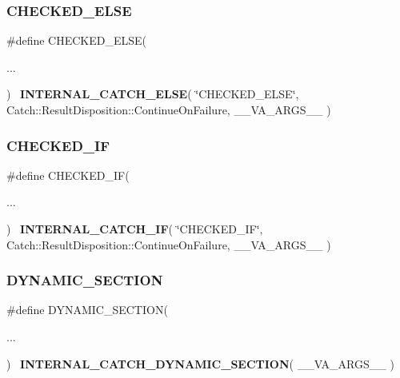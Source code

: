 \mbox{\label{catch_8hpp_a5fa42bb950a65e22eac778c86b27d832}} 
\subsubsection{CHECKED\_ELSE}
{\footnotesize\ttfamily \#define C\+H\+E\+C\+K\+E\+D\+\_\+\+E\+L\+SE(\begin{DoxyParamCaption}\item[{}]{... }\end{DoxyParamCaption})~\textbf{ I\+N\+T\+E\+R\+N\+A\+L\+\_\+\+C\+A\+T\+C\+H\+\_\+\+E\+L\+SE}( \char`\"{}C\+H\+E\+C\+K\+E\+D\+\_\+\+E\+L\+SE\char`\"{}, Catch\+::\+Result\+Disposition\+::\+Continue\+On\+Failure, \+\_\+\+\_\+\+V\+A\+\_\+\+A\+R\+G\+S\+\_\+\+\_\+ )}

\mbox{\label{catch_8hpp_a354466c7b989ec55784c02d74013263c}} 
\subsubsection{CHECKED\_IF}
{\footnotesize\ttfamily \#define C\+H\+E\+C\+K\+E\+D\+\_\+\+IF(\begin{DoxyParamCaption}\item[{}]{... }\end{DoxyParamCaption})~\textbf{ I\+N\+T\+E\+R\+N\+A\+L\+\_\+\+C\+A\+T\+C\+H\+\_\+\+IF}( \char`\"{}C\+H\+E\+C\+K\+E\+D\+\_\+\+IF\char`\"{}, Catch\+::\+Result\+Disposition\+::\+Continue\+On\+Failure, \+\_\+\+\_\+\+V\+A\+\_\+\+A\+R\+G\+S\+\_\+\+\_\+ )}

\mbox{\label{catch_8hpp_aa1caa37b980555de35faefa9191b5128}} 
\subsubsection{DYNAMIC\_SECTION}
{\footnotesize\ttfamily \#define D\+Y\+N\+A\+M\+I\+C\+\_\+\+S\+E\+C\+T\+I\+ON(\begin{DoxyParamCaption}\item[{}]{... }\end{DoxyParamCaption})~\textbf{ I\+N\+T\+E\+R\+N\+A\+L\+\_\+\+C\+A\+T\+C\+H\+\_\+\+D\+Y\+N\+A\+M\+I\+C\+\_\+\+S\+E\+C\+T\+I\+ON}( \+\_\+\+\_\+\+V\+A\+\_\+\+A\+R\+G\+S\+\_\+\+\_\+ )}

